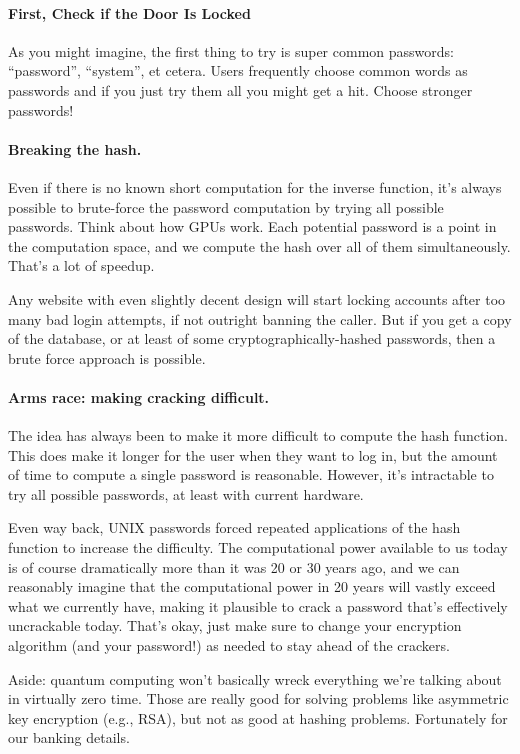 \documentclass[a4paper]{report}
\begin{document}
\paragraph{First, Check if the Door Is Locked}
As you might imagine, the first thing to try is super common passwords: ``password'', ``system'', et cetera. Users frequently choose common words as passwords and if you just try them all you might get a hit. Choose stronger passwords!

\paragraph{Breaking the hash.} Even if there is no known short computation for the
inverse function, it's always possible to brute-force the password
computation by trying all possible passwords. Think about how GPUs
work. Each potential password is a point in the computation space, and
we compute the hash over all of them simultaneously.  That's a lot of
speedup.

Any website with even slightly decent design will start locking accounts after too many bad login attempts, if not outright banning the caller. But if you get a copy of the database, or at least of some cryptographically-hashed passwords, then a brute force approach is possible.

\paragraph{Arms race: making cracking difficult.} The idea has always been
to make it more difficult to compute the hash function. This does make it longer for the user when they want to log in, but the amount of time to compute a single password is reasonable. However, it's intractable to try all possible passwords, at least with current hardware. 

Even way back,
UNIX passwords forced repeated applications of the hash function to increase the difficulty. The computational power available to us today is of course dramatically more than it was 20 or 30 years ago, and we can reasonably imagine that the computational power in 20 years will vastly exceed what we currently have, making it plausible to crack a password that's effectively uncrackable today. That's okay, just make sure to change your encryption algorithm (and your password!) as needed to stay ahead of the crackers.

Aside: quantum computing won't basically wreck everything we're talking about in virtually zero time. Those are really good for solving problems like asymmetric key encryption (e.g., RSA), but not as good at hashing problems. Fortunately for our banking details.
\end{document}
